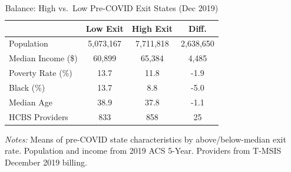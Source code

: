 \begin{table}[t]
\centering
\caption{Balance: High vs.\ Low Pre-COVID Exit States (Dec 2019)}
\label{tab:balance}
\begin{tabular}{lccc}
\toprule
 & Low Exit & High Exit & Diff. \\
\midrule
Population & 5,073,167 & 7,711,818 & 2,638,650 \\
Median Income (\$) & 60,899 & 65,384 & 4,485 \\
Poverty Rate (\%) & 13.7 & 11.8 & -1.9 \\
Black (\%) & 13.7 & 8.8 & -5.0 \\
Median Age & 38.9 & 37.8 & -1.1 \\
HCBS Providers & 833 & 858 & 25 \\
\bottomrule
\end{tabular}
\begin{minipage}{0.85\textwidth}
\vspace{0.2cm}
\footnotesize \textit{Notes:} Means of pre-COVID state characteristics by above/below-median exit rate. Population and income from 2019 ACS 5-Year. Providers from T-MSIS December 2019 billing.
\end{minipage}
\end{table}
